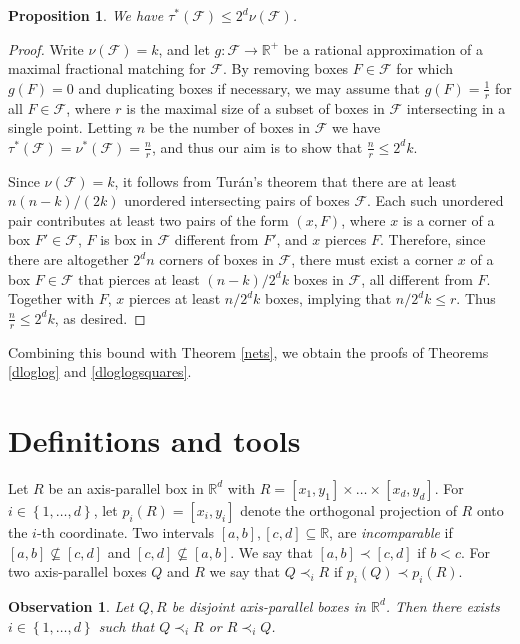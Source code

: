 \documentclass[12pt]{amsart}
\theoremstyle{plain}
\newtheorem{proposition}[theorem]{Proposition}
\newtheorem{observation}[theorem]{Observation}
\theoremstyle{definition}
\theoremstyle{remark}
\newcommand{\F}{\mathcal{F}}
\newcommand{\R}{\mathbb{R}}
\newcommand{\sset}[1]{\left\{#1\right\}}
\begin{document}
\begin{proposition}
We have $\tau^*(\F) \le 2^d\nu(\F)$.  
\end{proposition}
\begin{proof}
Write $\nu(\F) = k$, and let $g:\F \to \mathbb{R}^+$ be a rational approximation of a maximal fractional matching for $\F$. By removing boxes $F\in \F$ for which $g(F)=0$
and duplicating boxes if necessary,
we may assume that $g(F)=\frac{1}{r}$ for all $F
\in \F$, where $r$ is the maximal size of a subset of boxes in $\F$ intersecting in a single point. Letting $n$ be the number of boxes in $\F$ we have $\tau^*(\F)=\nu^*(\F)=\frac{n}{r}$, and thus our aim is to show that
$\frac{n}{r} \le 2^dk$.

Since $\nu(\F)=k$, it follows from Tur\'{a}n's theorem that there are at least $n(n - k)/(2k)$ unordered intersecting pairs of boxes $\F$. Each such unordered pair contributes at least two pairs of the form $(x,F)$, where $x$ is
a corner of a box $F'\in \F$, $F$ is box in $\F$ different from $F'$, and $x$ pierces $F$. Therefore, since there are altogether $2^dn$ corners of boxes in $\F$, there must exist a corner $x$   
of a box $F\in \F$ that pierces at least $(n - k)/2^dk$ boxes in $\F$, all different from $F$. Together with $F$, $x$ pierces at least $n/2^dk$ boxes, implying that $n/2^dk \le r$. Thus $\frac{n}{r} \le 2^dk$, as desired.  
\end{proof}

Combining this bound with Theorem \ref{nets}, we obtain the proofs of Theorems \ref{dloglog} and \ref{dloglogsquares}.

\section{Definitions and tools}
Let $R$ be an axis-parallel box in $\R^d$ with $R = [x_1, y_1] \times \dots \times [x_d, y_d]$. For $i \in \sset{1, \dots, d}$, let $p_i(R) = [x_i, y_i]$ denote the  orthogonal projection of $R$ onto the $i$-th coordinate. Two intervals $[a,b], [c,d] \subseteq \R$, are \emph{incomparable} if $[a,b] \not\subseteq [c,d]$ and $[c,d] \not\subseteq [a,b]$. We say that $[a, b] \prec [c, d]$ if $b < c$. For two axis-parallel boxes $Q$ and $R$ we say that $Q \prec_i R$ if $p_i(Q) \prec p_i(R)$. 

\begin{observation} \label{obs:disjoint} Let $Q, R$ be disjoint axis-parallel boxes in $\R^d$. Then there exists $i \in \sset{1, \dots, d}$ such that $Q \prec_i R$ or $R \prec_i Q$. 
\end{observation}
\end{document}
